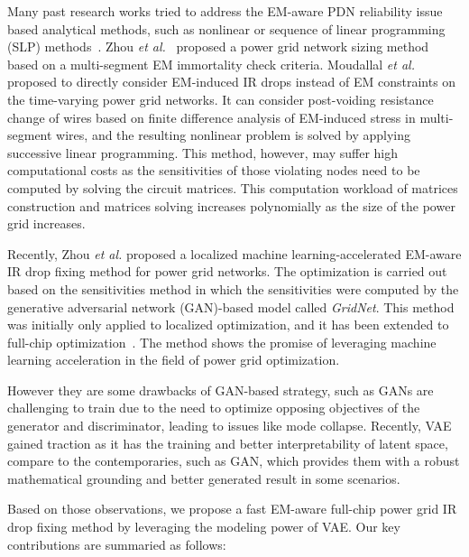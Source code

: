 Many past research works tried to address the EM-aware PDN reliability issue based analytical methods, such as nonlinear or sequence of linear programming (SLP) methods~\cite{ChBr:TCAD'88,DuMa:DAC'89,Tan:DAC'99,Wang:TCAD'05,ZhouSun:TVLSI'19, Sukharev:2019pg, ZhouYu:ASPDAC'20,ZhouJin:ICCAD'20}. Zhou {\it et al.}~\cite{ZhouSun:TVLSI'19,ZhouChen:Integration'21} proposed a power grid network sizing method based on a multi-segment EM immortality check criteria. Moudallal {\it et al.}~\cite{Sukharev:2019pg} proposed to directly consider EM-induced IR drops instead of EM constraints on the time-varying power grid networks. It can consider post-voiding resistance change of wires based on finite difference analysis of EM-induced stress in multi-segment wires, and the resulting nonlinear problem is solved by applying successive linear programming. This method, however, may suffer high computational costs as the sensitivities of those violating nodes need to be computed by solving the circuit matrices. This computation workload of matrices construction and matrices solving increases polynomially as the size of the power grid increases. 
   
Recently, Zhou {\it et al.} proposed a localized machine learning-accelerated EM-aware IR drop fixing method for power grid networks. The optimization is carried out based on the sensitivities method in which the sensitivities were computed by the generative adversarial network (GAN)-based model called {\it GridNet}. This method was initially only applied to localized optimization, and it has been extended to full-chip optimization~\cite{HanLiu:TCAD'22-23}.  The method shows the promise of leveraging machine learning acceleration in the field of power grid optimization.

However they are some drawbacks of GAN-based strategy, such as GANs are challenging to train due to the need to optimize opposing objectives of the generator and discriminator, leading to issues like mode collapse. Recently,  VAE gained traction as it has the training and better interpretability of latent space, compare to the contemporaries, such as GAN, which provides them with a robust mathematical grounding and better generated result in some scenarios. 

Based on those observations, we propose a fast EM-aware full-chip power grid IR drop fixing method by leveraging the modeling power of VAE. Our key contributions are summaried as follows:

